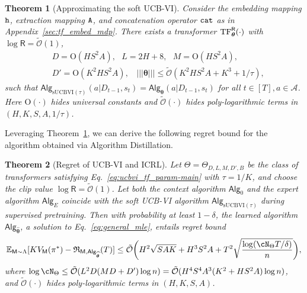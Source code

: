 \documentclass[10pt]{article}
\newtheorem{theorem}{Theorem}
\newcommand{\<}{\left\langle}
\renewcommand{\>}{\right\rangle}
\newcommand{\TF}{{\rm TF}}
\newcommand{\nrmp}[1]{{\left|\!\left|\!\left|{#1}\right|\!\right|\!\right|}}
\newcommand{\E}{\mathbb{E}}
\newcommand{\inst}{{\mathsf{M}}}
\newcommand{\temp}{{\tau}}
\newcommand{\tcO}{{\tilde{\mathcal O}}}
\newcommand{\state}{{s}}
\newcommand{\action}{{a}}
\newcommand{\totlen}{{T}} %
\newcommand{\cat}{{\tt cat}}
\newcommand{\extractmap}{{\tt A}}
\newcommand{\embedmap}{{\tt h}}
\newcommand{\sAlg}{{\mathsf{Alg}}}
\newcommand{\dset}{{D}}
\newcommand{\Numobs}{{n}}   %
\newcommand{\Parspace}{{\Theta}}
\newcommand{\esttfpar}{{\widehat{\btheta}}}
\newcommand{\plc}{{\pi}}
\newcommand{\prior}{{\Lambda}}
\newcommand{\Numepi}{{K}}
\newcommand{\horizon}{{H}}
\newcommand{\actionsp}{{\mathcal{A}}}
\renewcommand{\horizon}{{H}}
\newcommand{\valuefun}{{V}}
\newcommand{\shortexp}{{E}}
\newcommand{\tfpar}{{\btheta}}
\newcommand{\layer}{{L}}
\newcommand{\hidden}{{D'}}
\newcommand{\head}{{M}}
\newcommand{\clipval}{{\mathsf{R}}}
\newcommand{\embd}{{D}}  %
\newcommand{\totreward}{{\mathfrak{R}}}  %
\newcommand{\Numst}{{S}}
\newcommand{\Numact}{{A}}
\newcommand{\Vfun}{{\valuefun}}
\newcommand{\sUCBVI}{{\mathrm{sUCBVI}}}
\newcommand{\conO}{{\mathrm{O}}}
\def\btheta{{\boldsymbol \theta}}
\begin{document}
\begin{theorem}[Approximating the soft UCB-VI]\label{thm:approx_ucbvi}
Consider the embedding mapping $\embedmap$, extraction mapping $\extractmap$, and concatenation operator $\cat$ as in Appendix~\ref{sec:tf_embed_mdp}. There exists a transformer $\TF_\btheta^{\clipval}(\cdot)$ with $\log \clipval = \tcO(1)$, 
\begin{equation}\label{eq:ucbvi_tf_param-main}
\begin{aligned}
&~D =\conO(\horizon\Numst^2\Numact),~~~L= 2\horizon+8,~~~M= \conO(\horizon\Numst^2\Numact),\\
&~\hidden= \conO(\Numepi^2\horizon\Numst^2\Numact),~~~~\nrmp{\btheta}\leq \tcO(\Numepi^2\horizon\Numst^2\Numact+\Numepi^3+1/\temp),
\end{aligned} 
\end{equation}
such that 
$\sAlg_{\sUCBVI(\tau)}(\action|\dset_{t-1},\state_t) = \sAlg_{\tfpar}(\action|\dset_{t-1},\state_t)$ for all $t\in[T],\action\in\actionsp$. Here $\conO(\cdot)$ hides universal constants and $\tcO(\cdot)$  hides poly-logarithmic terms in $(\horizon,\Numepi,\Numst,\Numact,1/\temp)$. 
\end{theorem}

Leveraging Theorem~\ref{thm:approx_ucbvi}, we can derive the following regret bound for the algorithm obtained via Algorithm Distillation. 

\begin{theorem}[Regret of UCB-VI and ICRL]\label{thm:ucbvi_icrl-main}
Let $\Theta = \Theta_{D, L, M, \hidden, B}$ be the class of transformers satisfying Eq.~\eqref{eq:ucbvi_tf_param-main} with $\temp = 1/\Numepi$, and choose the clip value $\log \clipval = \tcO(1)$. Let both the context algorithm $\sAlg_0$ and the expert algorithm $\sAlg_\shortexp$ coincide with the soft UCB-VI algorithm $\sAlg_{\sUCBVI(\tau)}$ during supervised pretraining.  Then with probability at least $1-\delta$, the learned algorithm $\sAlg_{\esttfpar}$, a solution to Eq.~\eqref{eq:general_mle}, entails regret bound
\begin{align*}
\E_{\inst\sim\prior}[\Numepi\Vfun_\inst(\plc^*)-\totreward_{\inst,\sAlg_\esttfpar}(\totlen)]\leq \tcO \bigg(\horizon^2\sqrt{\Numst\Numact\Numepi}+\horizon^3\Numst^2\Numact+\totlen^2\sqrt{\frac{\log ( \cN_{\Parspace} \totlen/\delta ) }{n} } \bigg),
\end{align*}
where $\log \cN_{\Parspace} \le \tcO(\layer^2\embd(\head\embd+\hidden) \log\Numobs) = \tcO(\horizon^4\Numst^4\Numact^3(\Numepi^2+\horizon\Numst^2\Numact)\log\Numobs)$, and $\tcO(\cdot)$ hides poly-logarithmic terms in $(\horizon,\Numepi,\Numst,\Numact)$. 
\end{theorem}
\end{document}
